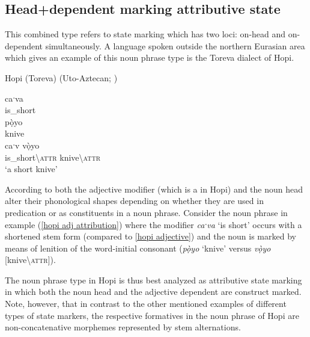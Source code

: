 \subsection{Head+dependent marking attributive state}
This combined type refers to state marking which has two loci: on-head and on-dependent simultaneously. A language spoken outside the northern Eurasian area which gives an example of this noun phrase type is the Toreva dialect of Hopi.
\begin{exe}
\ex 
\rm{Hopi (Toreva) (Uto-Aztecan; \citealt{whorf1946})}
\begin{xlist}
\ex	\label{hopi adjective}
\gll caˑva\\
	is\_short\\
\ex	
\gll pọ̀yo\\
	knive\\
\ex	\label{hopi adj attribution}
\gll caˑv vọ̀yo\\
 	is\_short\textbackslash\textsc{attr} knive\textbackslash\textsc{attr}\\
\glt	‘a short knive’
\end{xlist}
\end{exe}
According to \citet[178]{whorf1946} both the adjective modifier (which is a  in Hopi) and the noun head alter their phonological shapes depending on whether they are used in predication or as constituents in a noun phrase. Consider the noun phrase in example (\ref{hopi adj attribution}) where the modifier \textit{caˑva} ‘is short’ occurs with a shortened stem form (compared to \ref{hopi adjective}) and the noun is marked by means of lenition of the word-initial consonant (\textit{pọ̀yo} ‘knive’ versus \textit{vọ̀yo} [knive\textbackslash\textsc{attr}]).

The noun phrase type in Hopi is thus best analyzed as attributive state marking in which both the noun head and the adjective dependent are construct marked. Note, however, that in contrast to the other mentioned examples of different types of state markers, the respective formatives in the noun phrase of Hopi are non-concatenative morphemes represented by stem alternations.

